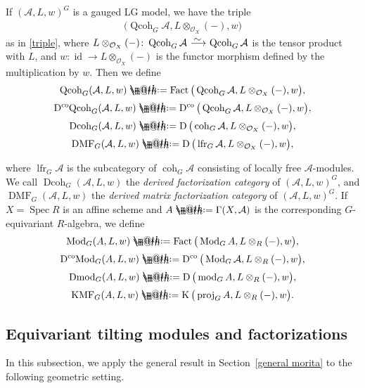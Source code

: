 \documentclass[10pt,a4paper]{amsart}
\makeatletter
\newcommand*{\defeq}{\mathrel{\rlap{%
 \raisebox{0.3ex}{$\m@th\cdot$}}%
 \raisebox{-0.3ex}{$\m@th\cdot$}}%
 =}
\numberwithin{equation}{section}
\newcommand{\Fact}{\operatorname{Fact}}
\newcommand{\Dmod}{\operatorname{Dmod}}
\newcommand{\DcoMod}{\operatorname{D^{co}\hspace{-0.1mm}Mod}}
\newcommand{\DMF}{\operatorname{DMF}}
\newcommand{\KMF}{\operatorname{KMF}}
\newcommand{\Dcoh}{\operatorname{Dcoh}}
\newcommand{\DcoQcoh}{\operatorname{D^{co}\hspace{-0.1mm}Qcoh}}
\newcommand{\Spec}{\operatorname{Spec}}
\newcommand{\coh}{\operatorname{coh}}
\newcommand{\Qcoh}{\operatorname{Qcoh}}
\newcommand{\Mod}{\operatorname{Mod}}
\newcommand{\fmod}{\operatorname{mod}}
\newcommand{\lfr}{\operatorname{lfr}}
\newcommand{\proj}{\operatorname{proj}}
\newcommand{\Dco}{\operatorname{D^{co}}}
\newcommand{\D}{\operatorname{D}}
\newcommand{\K}{\operatorname{K}}
\newcommand{\id}{\operatorname{id}}
\newcommand{\cA}{\mathcal{A}}
\newcommand{\cO}{\mathcal{O}}
\newcommand{\simto}{\,\,\,\,\raisebox{4pt}{$\sim$}{\kern -1.1em \longrightarrow}\,}
\makeatother
\begin{document}
If $(\cA,L,w)^G$ is a gauged LG model, we have the triple
\begin{gather*}
\big(\Qcoh_G\cA,L\otimes_{\cO_X}(-),w\big)
\end{gather*}
as in \eqref{triple}, where $L\otimes_{\cO_X}(-)\colon \Qcoh_G\cA\simto \Qcoh_G\cA$ is the tensor product with $L$, and $w\colon\id\to L\otimes_{\cO_X}(-)$ is the functor morphism defined by the multiplication by $w$. Then we define
\begin{gather*}
\Qcoh_G(\cA,L,w)\defeq\Fact\big(\Qcoh_G\cA,L\otimes_{\cO_X}(-),w\big),
\\[.5ex]
\DcoQcoh_G(\cA,L,w)\defeq\Dco\big(\Qcoh_G\cA,L\otimes_{\cO_X}(-),w\big),
\\[.5ex]
\Dcoh_G(\cA,L,w)\defeq\D\big(\coh_G\cA,L\otimes_{\cO_X}(-),w\big),
\\[.5ex]
\DMF_G(\cA,L,w)\defeq\D\big(\lfr_G\cA,L\otimes_{\cO_X}(-),w\big),
\end{gather*}
{\sloppy
where $\lfr_G\cA$ is the subcategory of $\coh_G\cA$ consisting of locally free $\cA$-modules. We call $\Dcoh_G(\cA,L,w)$ the {\it derived factorization category} of $(\cA,L,w)^G$, and $\DMF_G(\cA,L,w)$ the {\it derived matrix factorization category} of $(\cA,L,w)^G$. If $X=\Spec R$ is an affine scheme and $A\defeq\Gamma(X,\cA)$ is the corresponding $G$-equivariant $R$-algebra, we define
\begin{gather*}
\Mod_G(A,L,w)\defeq\Fact\big(\Mod_GA,L\otimes_{R}(-),w\big),
\\[.5ex]
\DcoMod_G(A,L,w)\defeq\Dco\big(\Mod_G\cA,L\otimes_{R}(-),w\big),
\\[.5ex]
\Dmod_G(A,L,w)\defeq\D\big(\fmod_GA,L\otimes_{R}(-),w\big),
\\[.5ex]
\KMF_G(A,L,w)\defeq\K\big(\proj_GA,L\otimes_{R}(-),w\big).
\end{gather*}

}


\subsection{Equivariant tilting modules and factorizations}
In this subsection, we apply the general result in Section~\ref{general morita} to the following geometric setting.
\end{document}
